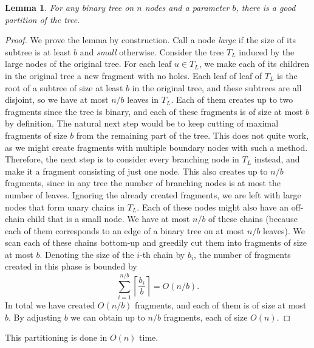 \documentclass[11pt,a4paper]{article}
\newtheorem{lemma}{Lemma}
\theoremstyle{definition}
\theoremstyle{remark}
\begin{document}
\begin{lemma}\label{basic partitioning lemma}
For any binary tree on $n$ nodes and a parameter $b$, there is a good partition of the tree.
\end{lemma}
\begin{proof}
We prove the lemma by construction. Call a node \textit{large} if the size of its subtree is at least $b$
and \textit{small} otherwise. Consider the tree $T_L$ induced by the large nodes of the original tree. 
For each leaf $u\in T_{L}$, we make each of its children in the original tree a new fragment with no holes.
Each leaf of leaf of $T_{L}$ is the root of a subtree of size at least $b$ in the original tree, and these subtrees
are all disjoint, so we have at most $n/b$ leaves in $T_{L}$. Each of them creates up to two fragments
since the tree is binary, and each of these fragments is of size at most $b$ by definition.
The natural next step would be to keep cutting of maximal fragments of size $b$ from the remaining
part of the tree. This does not quite work, as we might create fragments with multiple boundary
nodes with such a method.
Therefore, the next step is to consider every branching node in $T_{L}$ instead, and make it a fragment
consisting of just one node. This also creates up to $n/b$ fragments, since in any tree the number of
branching nodes is at most the number of leaves.
Ignoring the already created fragments, we are left with large nodes that form unary chains in $T_{L}$.
Each of these nodes might also have an off-chain child that is a small node. We have at most $n/b$ of these chains
(because each of them corresponds to an edge of a binary tree on at most $n/b$ leaves).
We scan each of these chains bottom-up and greedily cut them into fragments of size at most $b$.
Denoting the size of the $i$-th chain by $b_{i}$, the number of fragments created in this phase is
bounded by $$\sum_{i=1}^{n/b} \left\lceil \frac{b_i}{b} \right\rceil = O(n/b).$$
In total we have created $O(n/b)$ fragments, and each of them is of size at most $b$.
By adjusting $b$ we can obtain up to $n/b$ fragments, each of size $O(n)$.
\end{proof}
This partitioning is done in $O(n)$ time.
\end{document}
